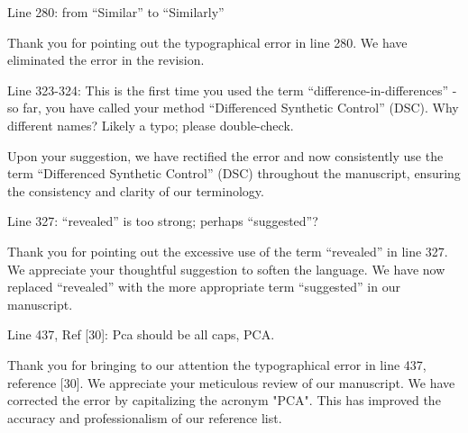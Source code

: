 \RC{} Line 280: from ``Similar'' to ``Similarly''

\AR{} Thank you for pointing out the typographical error in line 280. We have eliminated the error in the revision.

\RC{} Line 323-324: This is the first time you used the term ``difference-in-differences'' -so far, you have called your method ``Differenced Synthetic Control'' (DSC). Why different names? Likely a typo; please double-check.

\AR{} Upon your suggestion, we have rectified the error and now consistently use the term ``Differenced Synthetic Control'' (DSC) throughout the manuscript, ensuring the consistency and clarity of our terminology.

\RC{} Line 327: ``revealed'' is too strong; perhaps ``suggested''?

\AR{} Thank you for pointing out the excessive use of the term ``revealed'' in line 327. We appreciate your thoughtful suggestion to soften the language. We have now replaced ``revealed'' with the more appropriate term ``suggested'' in our manuscript.

\RC{} Line 437, Ref [30]: Pca should be all caps, PCA.\

\AR{} Thank you for bringing to our attention the typographical error in line 437, reference [30]. We appreciate your meticulous review of our manuscript. We have corrected the error by capitalizing the acronym "PCA". This has improved the accuracy and professionalism of our reference list.

